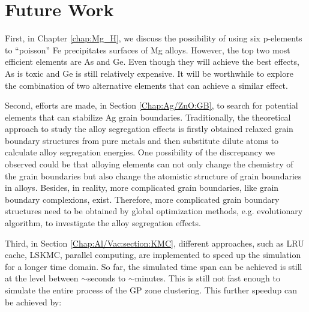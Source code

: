 \section{Future Work}

First, in Chapter \ref{chap:Mg_H}, we discuss the possibility of using six p-elements to ``poisson'' Fe precipitates surfaces of Mg alloys. However, the top two most efficient elements are As and Ge. Even though they will achieve the best effects, As is toxic and Ge is still relatively expensive. It will be worthwhile to explore the combination of two alternative elements that can achieve a similar effect.

Second, efforts are made, in Section \ref{Chap:Ag/ZnO:GB}, to search for potential elements that can stabilize Ag grain boundaries. Traditionally, the theoretical approach to study the alloy segregation effects is firstly obtained relaxed grain boundary structures from pure metals and then substitute dilute atoms to calculate alloy segregation energies. One possibility of the discrepancy we observed could be that alloying elements can not only change the chemistry of the grain boundaries but also change the atomistic structure of grain boundaries in alloys. Besides, in reality, more complicated grain boundaries, like grain boundary complexions, exist. \cite{cantwell2014grain} Therefore, more complicated grain boundary structures need to be obtained by global optimization methods, e.g. evolutionary algorithm, to investigate the alloy segregation effects.

Third, in Section \ref{Chap:Al/Vac:section:KMC}, different approaches, such as \ac{LRU} cache, \ac{LSKMC}, parallel computing, are implemented to speed up the simulation for a longer time domain. So far, the simulated time span can be achieved is still at the level between $\sim$seconds to $\sim$minutes. This is still not fast enough to simulate the entire process of the \ac{GP} zone clustering. This further speedup can be achieved by:

